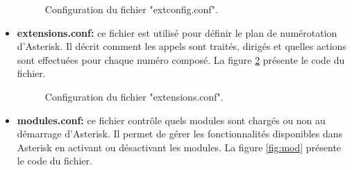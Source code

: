 \begin{itemize}
\begin{figure}[H]
        \caption{Configuration du fichier "extconfig.conf".}
        \label{fig:ext}
    \end{figure}
    \item \textbf{extensions.conf:} ce fichier est utilisé pour définir le plan de numérotation d’Asterisk. Il décrit comment les appels sont traités, dirigés et quelles actions sont effectuées pour chaque numéro composé. La figure \ref{fig:exts} présente le code du fichier.
   \begin{figure}[H]
        \centering
        \caption{Configuration du fichier "extensions.conf".}
        \label{fig:exts}
    \end{figure}
    \item \textbf{modules.conf:} ce fichier contrôle quels modules sont chargés ou non au démarrage d’Asterisk. Il permet de gérer les fonctionnalités disponibles dans Asterisk en activant ou désactivant les modules. La figure \ref{fig:mod} présente le code du fichier.
   \begin{figure}[H]
        \centering

\end{figure}
\end{itemize}
